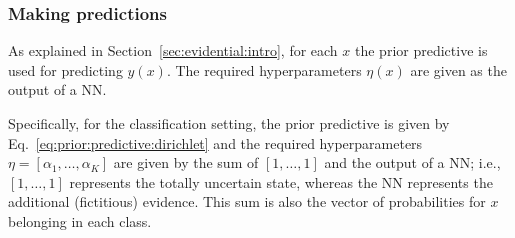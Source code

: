 \subsubsection{Making predictions}
As explained in Section~\ref{sec:evidential:intro}, for each $x$ the prior predictive is used for predicting $y(x)$.
The required hyperparameters $\eta(x)$ are given as the output of a NN. 

Specifically, for the classification setting, the prior predictive is given by Eq.~\eqref{eq:prior:predictive:dirichlet} and the required hyperparameters $\eta = [\alpha_1, \dots, \alpha_K]$ are given by the sum of $[1, \dots, 1]$ and the output of a NN; i.e., $[1, \dots, 1]$ represents the totally uncertain state, whereas the NN represents the additional (fictitious) evidence.
This sum is also the vector of probabilities for $x$ belonging in each class.

